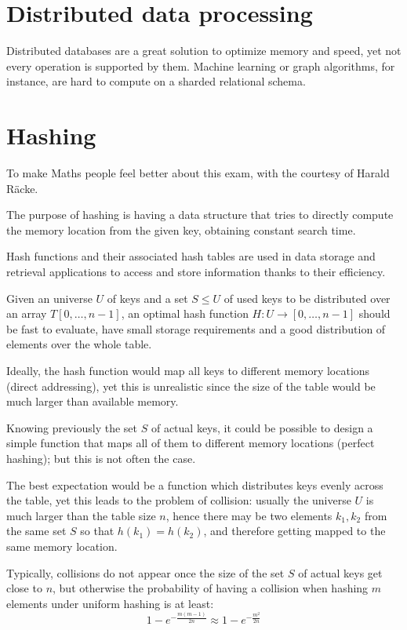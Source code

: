 \section{Distributed data processing}
Distributed databases are a great solution to optimize memory and speed, yet not every operation is supported by them. Machine learning or graph algorithms, for instance, are hard to compute on a sharded relational schema.




\section{Hashing}
To make Maths people feel better about this exam, with the courtesy of Harald Räcke.

The purpose of hashing is having a data structure that tries to directly compute the memory location from the given key, obtaining constant search time. 

Hash functions and their associated hash tables are used in data storage and retrieval applications to access and store information thanks to their efficiency.

Given an universe $U$ of keys and a set $S \leq U$ of used keys to be distributed over an array $T[0, \dots, n-1]$, an optimal hash function $H : U \rightarrow [0, \dots, n-1]$ should be fast to evaluate, have small storage requirements and a good distribution of elements over the whole table.

Ideally, the hash function would map all keys to different memory locations (direct addressing), yet this is unrealistic since the size of the table would be much larger than available memory.

Knowing previously the set $S$ of actual keys, it could be possible to design a simple function that maps all of them to different memory locations (perfect hashing); but this is not often the case.

The best expectation would be a function which distributes keys evenly across the table, yet this leads to the problem of collision: usually the universe $U$ is much larger than the table size $n$, hence there may be two elements $k_1, k_2$ from the same set $S$ so that $h(k_1) = h(k_2)$, and therefore getting mapped to the same memory location.

Typically, collisions do not appear once the size of the set $S$ of actual keys get close to $n$, but otherwise the probability of having a collision when hashing $m$ elements under uniform hashing is at least:
$$1 - e^{-\frac{m(m-1)}{2n}} \approx 1 - e^{-\frac{m^2}{2n}}$$

